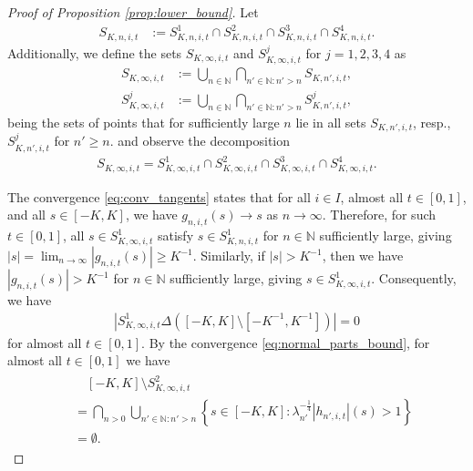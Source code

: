 \documentclass[11pt]{article}
\numberwithin{statement}{section}
\numberwithin{equation}{section}
\theoremstyle{remark}
\newcommand{\N}{\mathbb N}
\begin{document}
\begin{proof}[Proof of Proposition \ref{prop:lower_bound}]
	
	Let
	\begin{align}
		S_{K,n,i,t} & := S^1_{K,n,i,t} \cap S^2_{K,n,i,t} \cap S^3_{K,n,i,t}\cap S^4_{K,n,i,t}.
	\end{align}
	Additionally, we define the sets $ S_{K,\infty,i,t}$ and
        $S^j_{K,\infty,i,t}$ for $j =1,2,3,4$ as
	\begin{align}\label{def:S}
          S_{K,\infty,i,t}& := \bigcup_{n \in \N} \bigcap_{n' \in \N: n' >n}  S_{K,n',i,t},\\
          S^j_{K,\infty,i,t}& := \bigcup_{n \in \N} \bigcap_{n' \in
                              \N: n' >n}
                              S^j_{K,n',i,t}, \label{def:S_j} 
	\end{align}
	being the sets of points that for sufficiently large $n$ lie
        in all sets $S_{K,n',i,t}$, resp., $S^j_{K,n',i,t}$ for
        $n' \geq n$.  and observe the decomposition
	\begin{align}\label{eq:decomp_s}
          S_{K,\infty,i,t} = S^1_{K,\infty,i,t} \cap
          S^2_{K,\infty,i,t} \cap S^3_{K,\infty,i,t} \cap
          S^4_{K,\infty,i,t}. 
	\end{align}
	
	The convergence \eqref{eq:conv_tangents} states that for all
        $i\in I$, almost all $t\in [0,1]$, and all $s\in [-K,K]$,
        we have $g_{n,i,t}(s) \to s$ as $n \to \infty$.  Therefore,
        for such $t\in [0,1]$, all $s \in S^1_{K,\infty,i,t}$
        satisfy $s \in S^1_{K,n,i,t}$ for $n\in \N$ sufficiently
        large, giving
        $|s| = \lim_{n \to \infty} |g_{n,i,t}(s)| \geq K^{-1}$.
        Similarly, if $|s| > K^{-1}$, then we have
        $|g_{n,i,t}(s)| > K^{-1}$ for $n \in \N$ sufficiently large,
        giving $s \in S^1_{K,\infty,i,t}$.  Consequently, we have
	\begin{align}\label{eq:S1_full}
          |S^1_{K,\infty,i,t} \Delta \left( [-K,K] \setminus
          [-K^{-1},K^{-1}]\right)| = 0 
	\end{align}
	for almost all $t \in [0,1]$.  By the convergence
        \eqref{eq:normal_parts_bound}, for almost all $t \in [0,1]$ we
        have
	\begin{align}\label{eq:S2_full}
	  \begin{split}
            & \quad[-K,K] \setminus S^2_{K,\infty,i,t} \\\
            & = \bigcap_{n>0} \bigcup_{n' \in \N: n' >n} \left\{ s \in
              [-K,K]: \lambda_{n'}^{-\frac{1}{4}}|h_{n',i,t}|(s) >
              1 \right\}  \\
            &= \emptyset.
	  \end{split}
	\end{align}
       

\end{proof}
\end{document}
